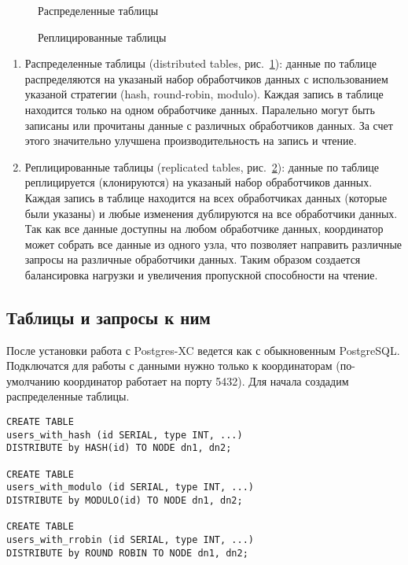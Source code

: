 \begin{figure}[ht!]
  \caption{Распределенные таблицы}
  \label{fig:postgres-xc2}
\end{figure}

\begin{figure}[ht!]
  \caption{Реплицированные таблицы}
  \label{fig:postgres-xc3}
\end{figure}

\begin{enumerate}
\item Распределенные таблицы (distributed tables, рис.~\ref{fig:postgres-xc2}): данные по таблице распределяются на указаный набор обработчиков данных с использованием указаной стратегии (hash, round-robin, modulo). Каждая запись в таблице находится только на одном обработчике данных. Паралельно могут быть записаны или прочитаны данные с различных обработчиков данных. За счет этого значительно улучшена производительность на запись и чтение.
\item Реплицированные таблицы (replicated tables, рис.~\ref{fig:postgres-xc3}): данные по таблице реплицируется (клонируются) на указаный набор обработчиков данных. Каждая запись в таблице находится на всех обработчиках данных (которые были указаны) и любые изменения дублируются на все обработчики данных. Так как все данные доступны на любом обработчике данных, координатор может собрать все данные из одного узла, что позволяет направить различные запросы на различные обработчики данных. Таким образом создается балансировка нагрузки и увеличения пропускной способности на чтение.
\end{enumerate}

\subsection{Таблицы и запросы к ним}

После установки работа с Postgres-XC ведется как с обыкновенным PostgreSQL. Подключатся для работы с данными нужно только к координаторам (по-умолчанию координатор работает на порту 5432). Для начала создадим распределенные таблицы.

\begin{lstlisting}[label=lst:postgres-xc2,caption=Создание распределенных таблиц]
CREATE TABLE 
users_with_hash (id SERIAL, type INT, ...) 
DISTRIBUTE by HASH(id) TO NODE dn1, dn2;

CREATE TABLE 
users_with_modulo (id SERIAL, type INT, ...) 
DISTRIBUTE by MODULO(id) TO NODE dn1, dn2;

CREATE TABLE 
users_with_rrobin (id SERIAL, type INT, ...) 
DISTRIBUTE by ROUND ROBIN TO NODE dn1, dn2;
\end{lstlisting}

